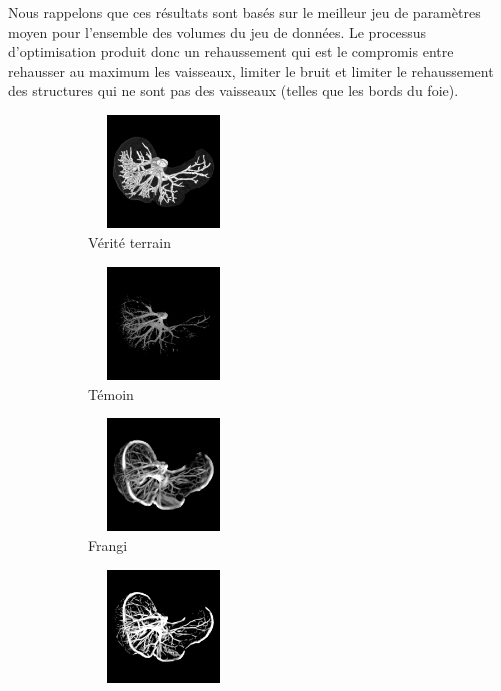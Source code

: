 Nous rappelons que ces résultats sont basés sur le meilleur jeu de paramètres moyen pour l'ensemble des volumes du jeu de données. Le processus d'optimisation produit donc un rehaussement qui est le compromis entre rehausser au maximum les vaisseaux, limiter le bruit et limiter le rehaussement des structures qui ne sont pas des vaisseaux (telles que les bords du foie). 
\begin{figure}[!ht]
  \captionsetup[subfigure]{justification=centering}
  \begin{subfigure}[t]{0.32\textwidth}
  \includegraphics[clip = true, trim  =  10 150 10 150, height=3cm,width=4cm]{Images/Ircad_GT.png}
  \caption{Vérité terrain}
  \end{subfigure}
  \begin{subfigure}[t]{0.32\textwidth}
  \includegraphics[clip = true, trim  =  10 150 10 150, height=3cm,width=4cm]{Images/Ircad_Baseline.png}
  \caption{Témoin}
  \end{subfigure}
  \begin{subfigure}[t]{0.32\textwidth}
  \includegraphics[clip = true, trim  =  10 150 10 150, height=3cm,width=4cm]{Images/Ircad_Frangi.png}
  \caption{Frangi}
  \end{subfigure}
  \begin{subfigure}[t]{0.32\textwidth}
  \includegraphics[clip = true, trim  =  10 150 10 150, height=3cm,width=4cm]{Images/Ircad_Jerman.png}

\end{subfigure}
\end{figure}
